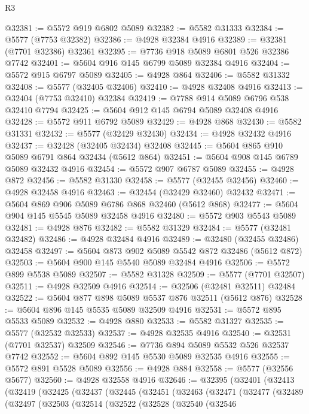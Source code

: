\begin{lexlean}{R3}
\begin{coremodule}
@32381 := @5572 @919 @6802 @5089
@32382 := @5582 @31333
@32384 := @5577 (@7753 @32382)
@32386 := @4928 @32384 @4916
@32389 := @32381 (@7701 @32386) @32361
@32395 := @7736 @918 @5089 @6801 @526 @32386 @7742
@32401 := @5604 @916 @145 @6799 @5089 @32384 @4916
@32404 := @5572 @915 @6797 @5089
@32405 := @4928 @864
@32406 := @5582 @31332
@32408 := @5577 (@32405 @32406)
@32410 := @4928 @32408 @4916
@32413 := @32404 (@7753 @32410) @32384
@32419 := @7788 @914 @5089 @6796 @538 @32410 @7794
@32425 := @5604 @912 @145 @6794 @5089 @32408 @4916
@32428 := @5572 @911 @6792 @5089
@32429 := @4928 @868
@32430 := @5582 @31331
@32432 := @5577 (@32429 @32430)
@32434 := @4928 @32432 @4916
@32437 := @32428 (@32405 @32434) @32408
@32445 := @5604 @865 @910 @5089 @6791 @864 @32434 (@5612 @864)
@32451 := @5604 @908 @145 @6789 @5089 @32432 @4916
@32454 := @5572 @907 @6787 @5089
@32455 := @4928 @872
@32456 := @5582 @31330
@32458 := @5577 (@32455 @32456)
@32460 := @4928 @32458 @4916
@32463 := @32454 (@32429 @32460) @32432
@32471 := @5604 @869 @906 @5089 @6786 @868 @32460 (@5612 @868)
@32477 := @5604 @904 @145 @5545 @5089 @32458 @4916
@32480 := @5572 @903 @5543 @5089
@32481 := @4928 @876
@32482 := @5582 @31329
@32484 := @5577 (@32481 @32482)
@32486 := @4928 @32484 @4916
@32489 := @32480 (@32455 @32486) @32458
@32497 := @5604 @873 @902 @5089 @5542 @872 @32486 (@5612 @872)
@32503 := @5604 @900 @145 @5540 @5089 @32484 @4916
@32506 := @5572 @899 @5538 @5089
@32507 := @5582 @31328
@32509 := @5577 (@7701 @32507)
@32511 := @4928 @32509 @4916
@32514 := @32506 (@32481 @32511) @32484
@32522 := @5604 @877 @898 @5089 @5537 @876 @32511 (@5612 @876)
@32528 := @5604 @896 @145 @5535 @5089 @32509 @4916
@32531 := @5572 @895 @5533 @5089
@32532 := @4928 @880
@32533 := @5582 @31327
@32535 := @5577 (@32532 @32533)
@32537 := @4928 @32535 @4916
@32540 := @32531 (@7701 @32537) @32509
@32546 := @7736 @894 @5089 @5532 @526 @32537 @7742
@32552 := @5604 @892 @145 @5530 @5089 @32535 @4916
@32555 := @5572 @891 @5528 @5089
@32556 := @4928 @884
@32558 := @5577 (@32556 @5677)
@32560 := @4928 @32558 @4916
@32646 := @32395
    (@32401
      (@32413
        (@32419
          (@32425
            (@32437
              (@32445
                (@32451
                  (@32463
                    (@32471
                      (@32477
                        (@32489
                          (@32497
                            (@32503
                              (@32514
                                (@32522
                                  (@32528
                                    (@32540
                                      (@32546

\end{coremodule}
\end{lexlean}
